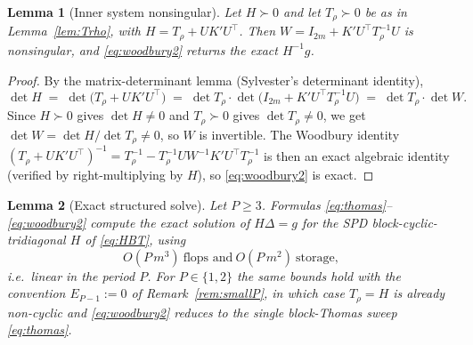 \documentclass{amsart}
\newtheorem{lemma}{Lemma}
\begin{document}
\begin{lemma}[Inner system nonsingular]\label{lem:inner}
Let $H\succ0$ and let $T_\rho\succ0$ be as in Lemma~\ref{lem:Trho}, with
$H=T_\rho+UK'U^{\!\top}$. Then $W=I_{2m}+K'U^{\!\top}T_\rho^{-1}U$ is nonsingular, and
\eqref{eq:woodbury2} returns the exact $H^{-1}g$.
\end{lemma}

\begin{proof}
By the matrix-determinant lemma (Sylvester's determinant identity),
\[
  \det H \;=\; \det\!\big(T_\rho+UK'U^{\!\top}\big)
        \;=\; \det T_\rho \cdot \det\!\big(I_{2m}+K'U^{\!\top}T_\rho^{-1}U\big)
        \;=\; \det T_\rho \cdot \det W .
\]
Since $H\succ0$ gives $\det H\neq0$ and $T_\rho\succ0$ gives $\det T_\rho\neq0$, we get
$\det W=\det H/\det T_\rho\neq0$, so $W$ is invertible. The Woodbury identity
$ (T_\rho+UK'U^{\!\top})^{-1}=T_\rho^{-1}-T_\rho^{-1}U W^{-1}K'U^{\!\top}T_\rho^{-1}$
is then an exact algebraic identity (verified by right-multiplying by $H$), so
\eqref{eq:woodbury2} is exact.
\end{proof}

\begin{lemma}[Exact structured solve]\label{lem:exact}
Let $P\ge3$. Formulas \eqref{eq:thomas}--\eqref{eq:woodbury2} compute the exact
solution of $H\Delta=g$ for the SPD block-cyclic-tridiagonal $H$ of \eqref{eq:HBT},
using
\[
  O(P\,m^3)\ \text{flops and}\ O(P\,m^2)\ \text{storage},
\]
i.e.\ \emph{linear} in the period $P$. For $P\in\{1,2\}$ the same bounds hold with the
convention $E_{P-1}:=0$ of Remark~\ref{rem:smallP}, in which case $T_\rho=H$ is already
non-cyclic and \eqref{eq:woodbury2} reduces to the single block-Thomas sweep
\eqref{eq:thomas}.
\end{lemma}
\end{document}
